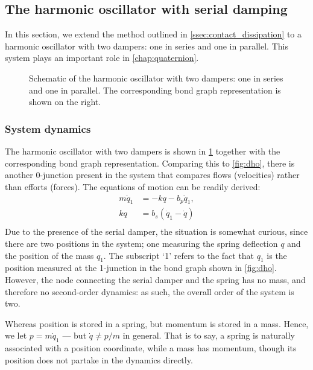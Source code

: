 \subsection{The harmonic oscillator with serial damping}
\label{ssec:serial_damping}
In this section, we extend the method outlined in \cref{ssec:contact_dissipation} to a harmonic oscillator with two dampers: one in series and one in parallel. This system plays an important role in \cref{chap:quaternion}.
\begin{figure}[ht!]
    \centering
    
    \caption{Schematic of the harmonic oscillator with two dampers: one in series and one in parallel. The corresponding bond graph representation is shown on the right.}
    \label{fig:double_damped_osc}
\end{figure}

\subsubsection{System dynamics}
The harmonic oscillator with two dampers is shown in \cref{fig:double_damped_osc} together with the corresponding bond graph representation. Comparing this to \cref{fig:dho}, there is another 0-junction present in the system that compares flows (velocities) rather than efforts (forces). The equations of motion can be readily derived:
\begin{equation}
    \begin{split}
        m\ddot{q}_1 &= -kq - b_p \dot{q}_1, \\
        kq &= b_s(\dot{q}_1 - \dot{q}) \\
    \end{split}
    \label{eq:serial_eom_raw}
\end{equation}
Due to the presence of the serial damper, the situation is somewhat curious, since there are two positions in the system; one measuring the spring deflection \(q\) and the position of the mass \(q_1\). The subscript `1' refers to the fact that \(q_1\) is the position measured at the 1-junction in the bond graph shown in \cref{fig:dho}. However, the node connecting the serial damper and the spring has no mass, and therefore no second-order dynamics: as such, the overall order of the system is two. 

Whereas position is stored in a spring, but momentum is stored in a mass.
Hence, we let \(p = m\dot{q}_1\) --- but \(\dot{q} \neq p/m\) in general. That is to say, a spring is naturally associated with a position coordinate, while a mass has momentum, though its position does not partake in the dynamics directly.

